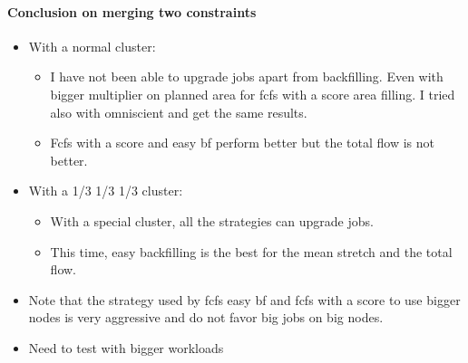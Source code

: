 \documentclass[a4paper]{article}
\begin{document}
\paragraph {Conclusion on merging two constraints}
\begin{itemize}
	\item With a normal cluster: \begin{itemize}
		\item I have not been able to upgrade jobs apart from backfilling. Even with bigger multiplier on planned area for fcfs with a score area filling. I tried also with omniscient and get the same results.
		\item Fcfs with a score and easy bf perform better but the total flow is not better. 
	\end{itemize}
	\item With a 1/3 1/3 1/3 cluster: \begin{itemize}
		\item With a special cluster, all the strategies can upgrade jobs.
		\item This time, easy backfilling is the best for the mean stretch and the total flow. 
	\end{itemize}
	\item Note that the strategy used by fcfs easy bf and fcfs with a score to use bigger nodes is very aggressive and do not favor big jobs on big nodes.
	\item Need to test with bigger workloads
\end{itemize}
\end{document}
